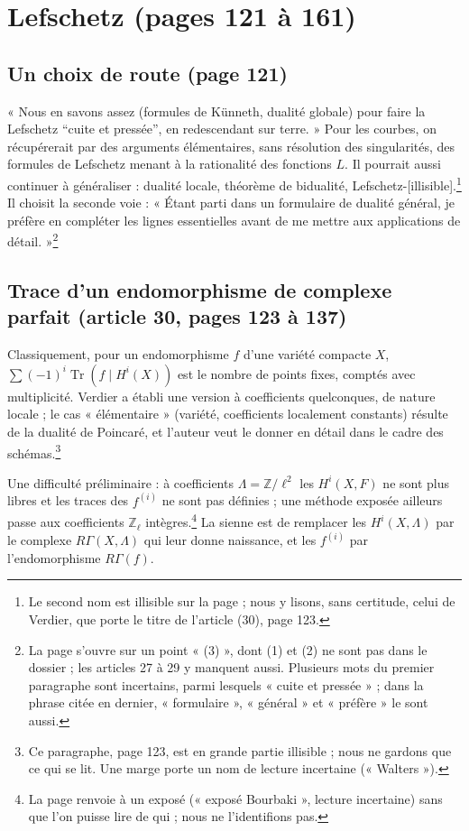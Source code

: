 \documentclass[11pt,a4paper]{article}
\begin{document}
\section*{Lefschetz (pages 121 à 161)}

\subsection*{Un choix de route (page 121)}

« Nous en savons assez (formules de Künneth, dualité globale) pour faire la
Lefschetz “cuite et pressée”, en redescendant sur terre. » Pour les courbes, on
récupérerait par des arguments élémentaires, sans résolution des
singularités, des formules de Lefschetz menant à la rationalité des fonctions
$L$. Il pourrait aussi continuer à généraliser : dualité locale, théorème de
bidualité, Lefschetz-[illisible].\footnote{Le second nom est illisible sur la
page ; nous y lisons, sans certitude, celui de Verdier, que porte le titre de
l'article (30), page 123.} Il choisit la seconde voie : « Étant parti dans
un formulaire de dualité général, je préfère en compléter les lignes
essentielles avant de me mettre aux applications de détail. »\footnote{La page
s'ouvre sur un point « (3) », dont (1) et (2) ne sont pas dans le dossier ; les
articles 27 à 29 y manquent aussi. Plusieurs mots du premier paragraphe sont
incertains, parmi lesquels « cuite et pressée » ; dans la phrase citée en
dernier, « formulaire », « général » et « préfère » le sont aussi.}

\subsection*{Trace d'un endomorphisme de complexe parfait (article 30, pages 123 à 137)}

Classiquement, pour un endomorphisme $f$ d'une variété compacte $X$,
$\sum(-1)^{i}\operatorname{Tr}(f \mid H^{i}(X))$ est le nombre de points
fixes, comptés avec multiplicité. Verdier a établi une version à coefficients
quelconques, de nature locale ; le cas « élémentaire » (variété, coefficients
localement constants) résulte de la dualité de Poincaré, et l'auteur veut
le donner en détail dans le cadre des schémas.\footnote{Ce paragraphe, page 123,
est en grande partie illisible ; nous ne gardons que ce qui se lit. Une marge
porte un nom de lecture incertaine (« Walters »).}

Une difficulté préliminaire : à coefficients $\Lambda = \mathbb{Z}/\ell^{2}$
les $H^{i}(X, F)$ ne sont plus libres et les traces des $f^{(i)}$ ne sont pas
définies ; une méthode exposée ailleurs passe aux coefficients
$\mathbb{Z}_{\ell}$ intègres.\footnote{La page renvoie à un exposé (« exposé
Bourbaki », lecture incertaine) sans que l'on puisse lire de qui ; nous ne
l'identifions pas.} La sienne est de remplacer les $H^{i}(X, \Lambda)$ par le
complexe $R\Gamma(X, \Lambda)$ qui leur donne naissance, et les $f^{(i)}$ par
l'endomorphisme $R\Gamma(f)$.
\end{document}
